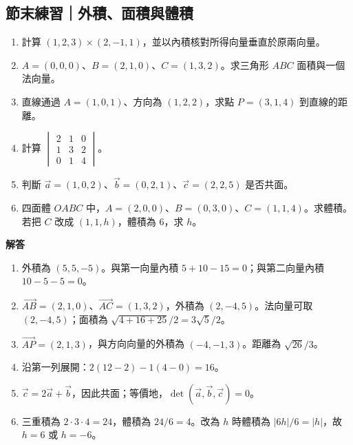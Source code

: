 \documentclass[11pt,a4paper]{article}
\providecommand{\tightlist}{%
  \setlength{\itemsep}{0pt}\setlength{\parskip}{0pt}}
\begin{document}
\begin{HandoutSelfCheck}

\subsection{節末練習｜外積、面積與體積}\label{ux7bc0ux672bux7df4ux7fd2ux5916ux7a4dux9762ux7a4dux8207ux9ad4ux7a4d}

\begin{enumerate}
\def\labelenumi{\arabic{enumi}.}
\tightlist
\item
  計算 \((1,2,3)\times(2,-1,1)\)，並以內積核對所得向量垂直於原兩向量。
\item
  \(A=(0,0,0)\)、\(B=(2,1,0)\)、\(C=(1,3,2)\)。求三角形 \(ABC\) 面積與一個法向量。
\item
  直線通過 \(A=(1,0,1)\)、方向為 \((1,2,2)\)，求點 \(P=(3,1,4)\) 到直線的距離。
\item
  計算 \(\begin{vmatrix}2&1&0\\1&3&2\\0&1&4\end{vmatrix}\)。
\item
  判斷 \(\vec a=(1,0,2)\)、\(\vec b=(0,2,1)\)、\(\vec c=(2,2,5)\) 是否共面。
\item
  四面體 \(OABC\) 中，\(A=(2,0,0)\)、\(B=(0,3,0)\)、\(C=(1,1,4)\)。求體積。若把 \(C\) 改成 \((1,1,h)\)，體積為 \(6\)，求 \(h\)。
\end{enumerate}

\textbf{解答}

\begin{enumerate}
\def\labelenumi{\arabic{enumi}.}
\tightlist
\item
  外積為 \((5,5,-5)\)。與第一向量內積 \(5+10-15=0\)；與第二向量內積 \(10-5-5=0\)。
\item
  \(\overrightarrow{AB}=(2,1,0)\)、\(\overrightarrow{AC}=(1,3,2)\)，外積為 \((2,-4,5)\)。法向量可取 \((2,-4,5)\)；面積為 \(\sqrt{4+16+25}/2=3\sqrt5/2\)。
\item
  \(\overrightarrow{AP}=(2,1,3)\)，與方向向量的外積為 \((-4,-1,3)\)。距離為 \(\sqrt{26}/3\)。
\item
  沿第一列展開：\(2(12-2)-1(4-0)=16\)。
\item
  \(\vec c=2\vec a+\vec b\)，因此共面；等價地，\(\det(\vec a,\vec b,\vec c)=0\)。
\item
  三重積為 \(2\cdot3\cdot4=24\)，體積為 \(24/6=4\)。改為 \(h\) 時體積為 \(|6h|/6=|h|\)，故 \(h=6\) 或 \(h=-6\)。
\end{enumerate}

\end{HandoutSelfCheck}
\end{document}
